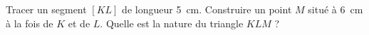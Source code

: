 
\begin{exercice}\label{exosmath-0911}

    Tracer un segment \( [KL]\) de longueur \SI{5}{\centi\meter}. Construire un point \( M\) situé à \SI{6}{\centi\meter} à la fois de \( K\) et de \( L\). Quelle est la nature du triangle \( KLM\) ?

\end{exercice}
